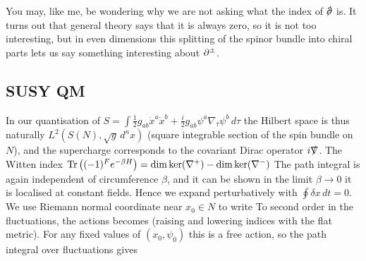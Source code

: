 \documentclass{article}
\begin{document}
\begin{remark}
	You may, like me, be wondering why we are not asking what the index of $\slashed{\del}$ is. It turns out that general theory says that it is always zero, so it is not too interesting, but in even dimensions this splitting of the spinor bundle into chiral parts lets us say something interesting about $\partial^\pm$. 
\end{remark}

\subsection{SUSY QM}
In our quantisation of $S = \int \frac{1}{2} g_{ab} \dot{x}^a \dot{x}^b + \frac{i}{2} g_{ab} \psi^a \nabla_\tau \psi^b \, d\tau$
the Hilbert space is thus naturally $L^2(S(N),\sqrt{g} \, d^n x)$ (square integrable section of the spin bundle on $N$), and the supercharge 
corresponds to the covariant Dirac operator $i \slashed{\nabla}$. The Witten index $\operatorname{Tr} \left( (-1)^F e^{-\beta H} \right) = \dim \ker (\nabla^+) - \dim \ker (\nabla^-)$
The path integral is again independent of circumference $\beta$, and it can be shown in the limit $\beta \to 0$ it is localised at constant fields. Hence we expand perturbatively
with $\oint \delta x \, dt = 0$. We use Riemann normal coordinate near $x_0 \in N$ to write 
To second order in the fluctuations, the actions becomes 
(raising and lowering indices with the flat metric). For any fixed values of $(x_0,\psi_0)$ this is a free action, so the path integral over fluctuations gives 
\end{document}
